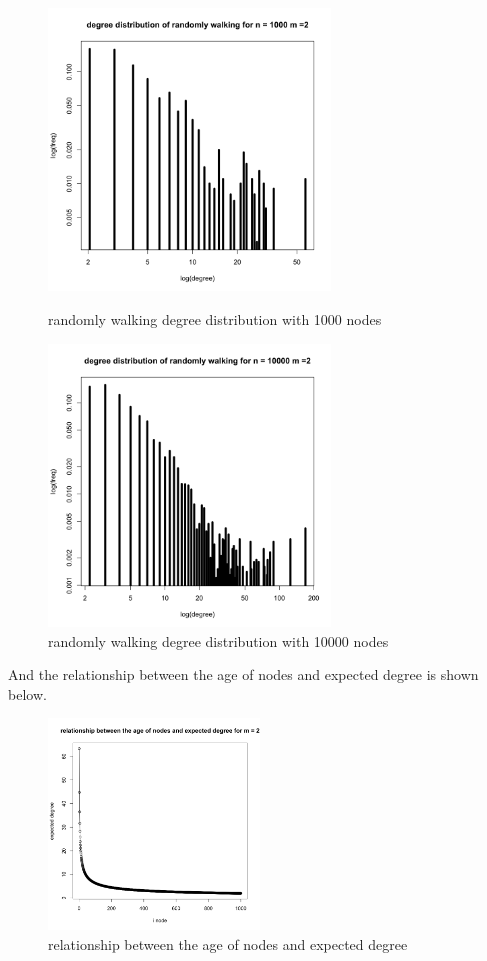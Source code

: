\documentclass[draftcls,12pt,onecolumn]{IEEEtran}
\begin{document}
\begin{figure}[htbp]
\centering
\begin{minipage}[t]{0.48\textwidth}
\centering
\includegraphics[width=7.5cm]{img/2_g_1_degree3}
\caption{randomly walking degree distribution with 1000 nodes}
\end{minipage}
\begin{minipage}[t]{0.48\textwidth}
\centering
\includegraphics[width=7.5cm]{img/2_g_1_degree4}
\caption{randomly walking degree distribution with 10000 nodes}
\end{minipage}
\end{figure}
And the relationship between the age of nodes and expected degree is shown below.
\begin{figure}[H]
\centering
\includegraphics[width=0.5\textwidth]{img/2_g_1_relat}
\caption{relationship between the age of nodes and expected degree}
\end{figure}
\end{document}
